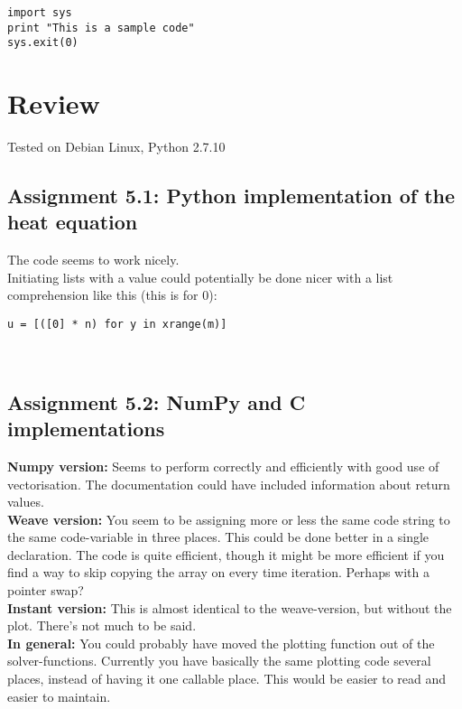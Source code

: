 \documentclass[a4paper]{article}
\begin{document}
\begin{verbatim}
import sys
print "This is a sample code"
sys.exit(0)
\end{verbatim}

\section{Review}\label{sec:review}

Tested on Debian Linux, Python 2.7.10

\subsection*{Assignment 5.1:  Python implementation of the heat equation}
The code seems to work nicely.\\
Initiating lists with a value could potentially be done nicer with a list comprehension like this (this is for 0):

\begin{verbatim}
u = [([0] * n) for y in xrange(m)]
\end{verbatim}
\\

\subsection*{Assignment 5.2: NumPy and C implementations} \label{sec:assignment5.2}
\textbf{Numpy version:}
Seems to perform correctly and efficiently with good use of vectorisation. The documentation could have included information about return values.
\\
\noindent\textbf{Weave version:}
You seem to be assigning more or less the same code string to the same code-variable in three places. This could be done better in a single declaration. The code is quite efficient, though it might be more efficient if you find a way to skip copying the array on every time iteration. Perhaps with a pointer swap?
\\
\noindent\textbf{Instant version:}
This is almost identical to the weave-version, but without the plot. There's not much to be said.
\\
\noindent\textbf{In general:}
You could probably have moved the plotting function out of the solver-functions. Currently you have basically the same plotting code several places, instead of having it one callable place. This would be easier to read and easier to maintain.
\end{document}
